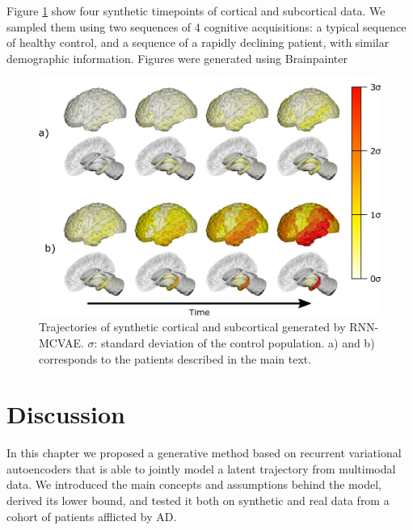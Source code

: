 Figure \ref{fig:rnn:qualitative} show four synthetic timepoints of cortical and subcortical data. We sampled them using two sequences of 4 cognitive acquisitions: a typical sequence of healthy control, and a sequence of a rapidly declining patient, with similar demographic information.  Figures were generated using Brainpainter \cite{Marinescu2019a} \\

\begin{figure}[!htbp]
  \centering
  \includegraphics[width=1.0\textwidth]{figures/rnnvae/brainpainter.png}
  \caption[Generated MRI-derived longitudinal markers.]{Trajectories of synthetic cortical and subcortical generated by RNN-MCVAE. $\sigma$: standard deviation of the control population. a) and b) corresponds to the patients described in the main text.}
 \label{fig:rnn:qualitative}
\end{figure}

\section{Discussion}
\label{rnn:discussion}

In this chapter we proposed a generative method based on recurrent variational autoencoders that is able to jointly model a latent trajectory from multimodal data. We introduced the main concepts and assumptions behind the model, derived its lower bound, and tested it both on synthetic and real data from a cohort of patients afflicted by AD. \\

